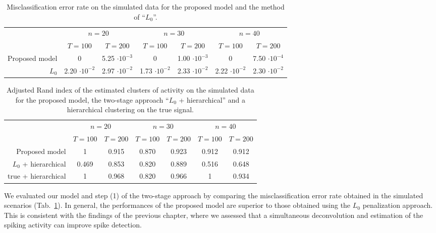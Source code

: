 \begin{table}
	\centering
	\begin{tabular}{r||cc|cc|cc}
		& \multicolumn{2}{c}{$n=20$}	    & \multicolumn{2}{c}{$n=30$} & \multicolumn{2}{c}{$n=40$} \\
		&  $T=100$ 		  & $T=200$ 		& $T=100$ 		  & $T=200$ & $T=100$ 		  & $T=200$ \\
		\hline
		Proposed model  		&		0		  	    &   5.25 $\cdot 10^{-3}$ &  0	& 1.00 $\cdot 10^{-3}$	&  0	& 7.50 $\cdot 10^{-4}$	\\
		$L_0$   & 2.20 $\cdot 10^{-2}$	&   2.97 $\cdot 10^{-2}$ & 1.73 $\cdot 10^{-2}$ & 2.33 $\cdot 10^{-2}$	&  2.22 $\cdot 10^{-2}$	& 2.30 $\cdot 10^{-2}$		
	\end{tabular}
	\caption[Misclassification error rate on the simulated data.]{Misclassification error rate on the simulated data for the proposed model and the method of \textcite{jewell2019} ``$L_0$''.\label{ch4:tab_misclass} } 	
\end{table}

\begin{table}
	\centering
	\begin{tabular}{r||cc|cc|cc}
		& \multicolumn{2}{c}{$n=20$}	    & \multicolumn{2}{c}{$n=30$}  & \multicolumn{2}{c}{$n=40$} \\
		&  $T=100$ 		  & $T=200$ 		& $T=100$ 		  & $T=200$   & $T=100$ 		  & $T=200$\\
		\hline
		Proposed model  		&		1		  &   0.915			&  0.870			  & 0.923 &  0.912		  & 0.912		\\
		$L_0$ + hierarchical    &		0.469	  &   0.853			&  0.820			  & 0.889 &  0.516		  & 0.648	\\
		true + hierarchical     &		1	      &   0.968			&  0.820			  & 0.966 &  1			  & 0.934	
	\end{tabular}
	\caption[Adjusted Rand index of the estimated clusters of activity on the simulated data.]{Adjusted Rand index of the estimated clusters of activity on the simulated data for the proposed model, the two-stage approach ``$L_0$ + hierarchical'' and a hierarchical clustering on the true signal.	\label{ch4:tab_Rand} }
\end{table}


We evaluated our model and step (1) of the two-stage approach by comparing the misclassification error rate obtained in the simulated scenarios (Tab.~\ref{ch4:tab_misclass}). In general, the performances of the proposed model are superior to those obtained using the $L_0$ penalization approach. This is consistent with the findings of the previous chapter, where we assessed that a simultaneous deconvolution and estimation of the spiking activity can improve spike detection.


